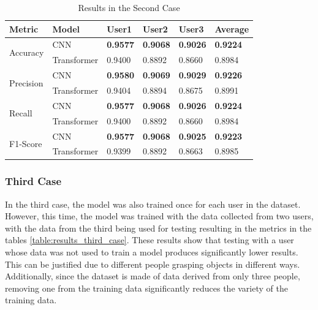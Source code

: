 \begin{table}[H]
    \centering
    \caption{Results in the Second Case}
    \label{table:results_second_case}
    \begin{tabular}{|l|l|l|l|l|l|}
        \hline
        Metric & Model & User1 & User2 & User3 & Average \\
        \hline \hline
        \multirow{2}{*}{Accuracy} & CNN & \textbf{0.9577} & \textbf{0.9068} & \textbf{0.9026} & \textbf{0.9224} \\
        \cline{2-6}
        & Transformer & 0.9400 & 0.8892 &  0.8660 & 0.8984 \\
        \hline \hline
        \multirow{2}{*}{Precision} & CNN & \textbf{0.9580} & \textbf{0.9069} & \textbf{0.9029} & \textbf{0.9226} \\
        \cline{2-6}
        & Transformer & 0.9404 & 0.8894 & 0.8675 & 0.8991 \\
        \hline \hline
        \multirow{2}{*}{Recall} & CNN & \textbf{0.9577} & \textbf{0.9068} & \textbf{0.9026} & \textbf{0.9224} \\
        \cline{2-6}
        & Transformer & 0.9400 & 0.8892 & 0.8660 & 0.8984 \\
        \hline \hline
        \multirow{2}{*}{F1-Score} & CNN & \textbf{0.9577} & \textbf{0.9068} & \textbf{0.9025} & \textbf{0.9223} \\
        \cline{2-6}
        & Transformer & 0.9399 & 0.8892 & 0.8663 & 0.8985 \\
        \hline
    \end{tabular}
\end{table}

\subsubsection{Third Case}

In the third case, the model was also trained once for each user in the dataset. However, this time, the model was trained with the data collected from two users, with the data from the third being used for testing resulting in the metrics in the tables \ref{table:results_third_case}. These results show that testing with a user whose data was not used to train a model produces significantly lower results. This can be justified due to different people grasping objects in different ways. Additionally, since the dataset is made of data derived from only three people, removing one from the training data significantly reduces the variety of the training data.

